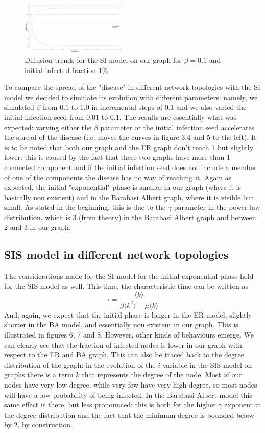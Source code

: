 \documentclass[sigchi]{acmart}
\begin{document}
\begin{figure}[!htbp]
    \centering
    \includegraphics[width=0.45\textwidth]{img/SI/diffusionOurSI_beta=0.1_frac=0.01.png}
    \caption{Diffusion trends for the SI model on our graph for $\beta = 0.1$ and initial infected fraction $1\%$}
    \label{fig:my_label}
\end{figure}
To compare the spread of the "disease" in different network topologies with the SI model we decided to simulate its evolution with different parameters: namely, we simulated $\beta$ from $0.1$ to $1.0$ in incremental steps of $0.1$ and we also varied the initial infection seed from $0.01$ to $0.1$. The results are essentially what was expected: varying either the $\beta$ parameter or the initial infection seed accelerates the spread of the disease (i.e. moves the curves in figure 3,4 and 5 to the left). It is to be noted that both our graph and the ER graph don't reach 1 but slightly lower: this is caused by the fact that these two graphs have more than 1 connected component and if the initial infection seed does not include a member of one of the components the disease has no way of reaching it. Again as expected, the initial "exponential" phase is smaller in our graph (where it is basically non existent) and in the Barabasi Albert graph, where it is visible but small. As stated in the beginning, this is due to the $\gamma$ parameter in the power law distribution, which is $3$ (from theory) in the Barabasi Albert graph and between $2$ and $3$ in our graph.
\subsection{SIS model in different network topologies}
The considerations made for the SI model for the initial exponential phase hold for the SIS model as well. This time, the characteristic time can be written as
$$\tau = \frac{\langle k \rangle}{\beta\langle k^2 \rangle-\mu\langle k \rangle}$$
And, again, we expect that the initial phase is longer in the ER model, slightly shorter in the BA model, and essentially non existent in our graph. This is illustrated in figures 6, 7 and 8. However, other kinds of behaviours emerge. We can clearly see that the fraction of infected nodes is lower in our graph with respect to the ER and BA graph. This can also be traced back to the degree distribution of the graph: in the evolution of the $i$ variable in the SIS model on graphs there is a term $k$ that represents the degree of the node. Most of our nodes have very low degree, while very few have very high degree, so most nodes will have a low probability of being infected. In the Barabasi Albert model this same effect is there, but less pronounced: this is both for the higher $\gamma$ exponent in the degree distribution and the fact that the minimum degree is bounded below by $2$, by construction.
\end{document}
